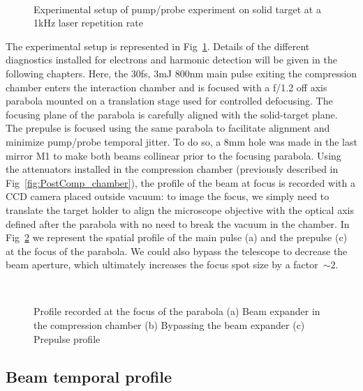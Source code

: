 \begin{figure}[H]
\centering
{}\\
\caption{\label{fig:SolidTargetChamber} Experimental setup of pump/probe experiment on solid target at a 1kHz laser repetition rate}
\end{figure}



The experimental setup is represented in Fig~\ref{fig:SolidTargetChamber}. Details of the different diagnostics installed for electrons and harmonic detection will be given in the following chapters. Here, the 30fs, 3mJ  800nm main pulse exiting the compression chamber enters the interaction chamber and is focused with a f/1.2  off axis parabola mounted on a translation stage used for controlled defocusing. The focusing plane of the parabola is carefully aligned with the solid-target plane. The prepulse is focused using the same parabola to facilitate alignment and minimize pump/probe temporal jitter. To do so, a 8mm hole was made in the last mirror M1 to make both beams collinear prior to the focusing parabola.
Using the attenuators installed in the compression chamber (previously described in Fig~\ref{fig:PostComp_chamber}), the profile of the beam at focus is recorded with a CCD camera placed outside vacuum: to image the focus, we simply need to translate the target holder to align the microscope objective with the optical axis defined after the parabola with no need to break the vacuum in the chamber. In Fig~\ref{fig:Focus} we represent the spatial profile of the main pulse (a) and the prepulse (c) at the focus of the parabola. We could also bypass the telescope to decrease the beam aperture, which ultimately increases the focus spot size by a factor~$\sim 2$.


\begin{figure}[H]
\centering
{}\\
\caption{\label{fig:Focus}Profile recorded at the focus of the parabola (a) Beam expander in the compression chamber (b) Bypassing the beam expander (c) Prepulse profile}
\end{figure}

\subsection{Beam temporal profile}

